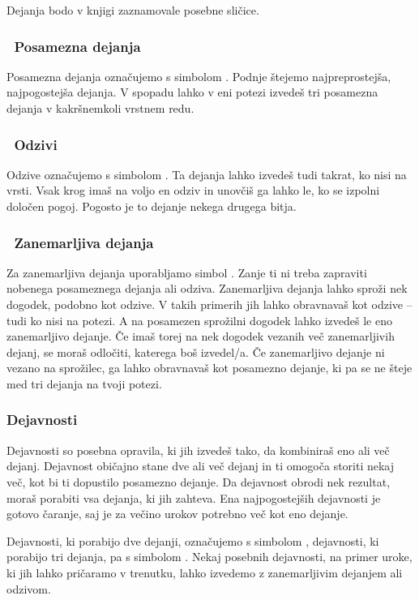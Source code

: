 Dejanja bodo v knjigi zaznamovale posebne sličice.

\subsubsection{\oneaction~Posamezna dejanja}
Posamezna dejanja označujemo s simbolom \oneaction. Podnje štejemo najpreprostejša, najpogostejša dejanja. V spopadu lahko v eni potezi izvedeš tri posamezna dejanja v kakršnemkoli vrstnem redu.

\subsubsection{\reaction~Odzivi}
Odzive označujemo s simbolom \reaction. Ta dejanja lahko izvedeš tudi takrat, ko nisi na vrsti. Vsak krog imaš na voljo en odziv in unovčiš ga lahko le, ko se izpolni določen pogoj. Pogosto je to dejanje nekega drugega bitja.

\subsubsection{\freeaction~Zanemarljiva dejanja}
Za zanemarljiva dejanja uporabljamo simbol \freeaction. Zanje ti ni treba zapraviti nobenega posameznega dejanja ali odziva. Zanemarljiva dejanja lahko sproži nek dogodek, podobno kot odzive. V takih primerih jih lahko obravnavaš kot odzive -- tudi ko nisi na potezi. A na posamezen sprožilni dogodek lahko izvedeš le eno zanemarljivo dejanje. Če imaš torej na nek dogodek vezanih več zanemarljivih dejanj, se moraš odločiti, katerega boš izvedel/a. Če zanemarljivo dejanje ni vezano na sprožilec, ga lahko obravnavaš kot posamezno dejanje, ki pa se ne šteje med tri dejanja na tvoji potezi.

\subsubsection{Dejavnosti}
Dejavnosti so posebna opravila, ki jih izvedeš tako, da kombiniraš eno ali več dejanj. Dejavnost običajno stane dve ali več dejanj in ti omogoča storiti nekaj več, kot bi ti dopustilo posamezno dejanje. Da dejavnost obrodi nek rezultat, moraš porabiti vsa dejanja, ki jih zahteva. Ena najpogostejših dejavnosti je gotovo čaranje, saj je za večino urokov potrebno več kot eno dejanje.

Dejavnosti, ki porabijo dve dejanji, označujemo s simbolom \twoactions, dejavnosti, ki porabijo tri dejanja, pa s simbolom \threeactions. Nekaj posebnih dejavnosti, na primer uroke, ki jih lahko pričaramo v trenutku, lahko izvedemo z zanemarljivim dejanjem ali odzivom.

